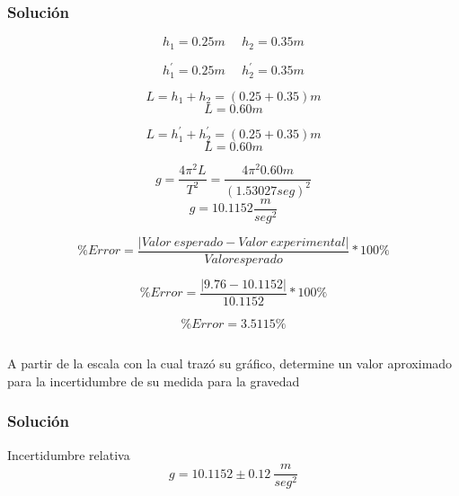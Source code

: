 \documentclass{article}
\begin{document}
\subsubsection{Solución}


\begin{equation}
    h_{1}=0.25m \ \ \ \ \ \ h_{2}=0.35m
\end{equation}

\begin{equation}
    h^{'}_{1}=0.25m \ \ \ \ \ \ h^{'}_{2}=0.35m
\end{equation}

\begin{equation*}
    L=h_{1}+h_{2}=(0.25+0.35)m 
\end{equation*}
\begin{equation}
    L=0.60m
\end{equation}


\begin{equation*}
    L=h^{'}_{1}+h^{'}_{2}=(0.25+0.35)m 
\end{equation*}
\begin{equation}
    L=0.60m
\end{equation}

\begin{equation*}
    g=\frac{4\pi^{2}L}{T^{2}}=\frac{4\pi^{2}0.60m}{(1.53027seg)^{2}}
\end{equation*}
\begin{equation}
    g=10.1152 \frac{m}{seg^{2}} 
\end{equation}

\begin{equation}
    \% Error = \frac{|Valor \ esperado-Valor \ experimental|}{Valor esperado}*100\%
\end{equation}

\begin{equation*}
    \% Error =\frac{|9.76-10.1152|}{10.1152}*100\%
\end{equation*}

\begin{equation}
    \% Error =3.5115 \%
\end{equation}

\subsection{}
A partir de la escala con la cual trazó su gráfico, determine un valor aproximado para la incertidumbre de su medida para la gravedad
\subsubsection{Solución}
Incertidumbre relativa
\begin{equation}
    g=10.1152\pm 0.12 \ \frac{m}{seg^{2}}
\end{equation}
\end{document}
